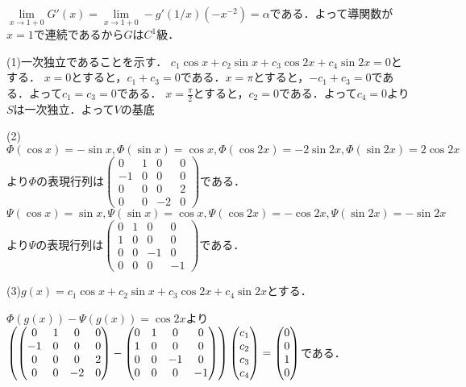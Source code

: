 \documentclass[
		book,
		head_space=20mm,
		foot_space=20mm,
		gutter=10mm,
		line_length=190mm
]{jlreq}
\begin{document}
$\lim\limits_{x\to 1+0}G'(x)=\lim\limits_{x\to 1+0}-g'(1/x)(-x^{-2})=\alpha$である．よって導関数が$x=1$で連続であるから$G$は$C^1$級．

(1)一次独立であることを示す．
$c_1\cos x +c_2\sin x +c_3\cos 2x +c_4\sin 2x=0$とする．
$x=0$とすると，$c_1+c_3=0$である．$x=\pi$とすると，$-c_1+c_3=0$である．よって$c_1=c_3=0$である．
$x=\frac{\pi}{2}$とすると，$c_2=0$である．よって$c_4=0$より$S$は一次独立．よって$V$の基底

(2)$\Phi(\cos x)=-\sin x,\Phi(\sin x)=\cos x,\Phi(\cos 2x)=-2\sin 2x,\Phi(\sin 2x)=2\cos 2x$より$\Phi$の表現行列は$ \begin{pmatrix}
	0 & 1 & 0 & 0\\
	-1 & 0 & 0 & 0\\
	0 & 0 & 0 & 2\\
	0 & 0 & -2 & 0
\end{pmatrix}$である．
$\Psi(\cos x)=\sin x,\Psi(\sin x)=\cos x,\Psi(\cos 2x)=-\cos 2x,\Psi(\sin 2x)=-\sin 2x$より$\Psi$の表現行列は$ \begin{pmatrix}
	0 & 1 & 0 & 0\\
	1 & 0 & 0 & 0\\
	0 & 0 & -1 & 0\\
	0 & 0 & 0 & -1
\end{pmatrix}$である．

(3)$g(x)=c_1\cos x +c_2\sin x +c_3\cos 2x +c_4\sin 2x$とする．

$\Phi(g(x))-\Psi(g(x))=\cos 2x$より$\qty(\begin{pmatrix}
	0 & 1 & 0 & 0\\
	-1 & 0 & 0 & 0\\
	0 & 0 & 0 & 2\\
	0 & 0 & -2 & 0
\end{pmatrix}-\begin{pmatrix}
	0 & 1 & 0 & 0\\
	1 & 0 & 0 & 0\\
	0 & 0 & -1 & 0\\
	0 & 0 & 0 & -1
	\end{pmatrix})\begin{pmatrix}
	c_1\\
	c_2\\
	c_3\\
	c_4
\end{pmatrix}=\begin{pmatrix}
	0\\
	0\\
	1\\
	0
	\end{pmatrix}$である．
\end{document}
